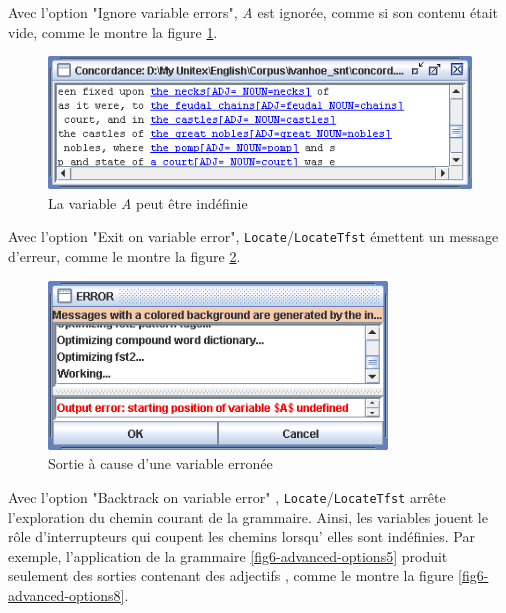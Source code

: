 \noindent Avec l'option "Ignore variable errors", \textit{A} est ignorée, comme si son contenu était
vide, comme le montre la figure
\ref{fig6-advanced-options6}. 

\bigskip
\begin{figure}[!h]
\begin{center}
\includegraphics[width=12cm]{resources/img/fig6-advanced-options6.png}
\caption{La variable \textit{A} peut être indéfinie
\label{fig6-advanced-options6}}
\end{center}
\end{figure}


\noindent Avec l'option "Exit on variable error", \verb+Locate+/\verb+LocateTfst+
émettent un message d'erreur, comme le montre la figure
\ref{fig6-advanced-options7}.

\bigskip
\begin{figure}[!h]
\begin{center}
\includegraphics[width=9cm]{resources/img/fig6-advanced-options7.png}
\caption{Sortie à cause d'une variable erronée\label{fig6-advanced-options7}}
\end{center}
\end{figure}

\noindent Avec l'option "Backtrack on variable error" ,
\verb+Locate+/\verb+LocateTfst+ arrête l'exploration du chemin courant de la
grammaire. Ainsi, les variables jouent  le rôle d'interrupteurs qui coupent les chemins
lorsqu' elles sont indéfinies. Par exemple, l'application de la grammaire
\ref{fig6-advanced-options5} produit seulement des sorties contenant des adjectifs
, comme le montre la figure \ref{fig6-advanced-options8}. 

